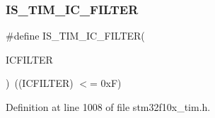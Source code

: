 \subsubsection{\texorpdfstring{I\+S\+\_\+\+T\+I\+M\+\_\+\+I\+C\+\_\+\+F\+I\+L\+T\+ER}{IS\_TIM\_IC\_FILTER}}
{\footnotesize\ttfamily \#define I\+S\+\_\+\+T\+I\+M\+\_\+\+I\+C\+\_\+\+F\+I\+L\+T\+ER(\begin{DoxyParamCaption}\item[{}]{I\+C\+F\+I\+L\+T\+ER }\end{DoxyParamCaption})~((I\+C\+F\+I\+L\+T\+ER) $<$= 0x\+F)}



Definition at line 1008 of file stm32f10x\+\_\+tim.\+h.

